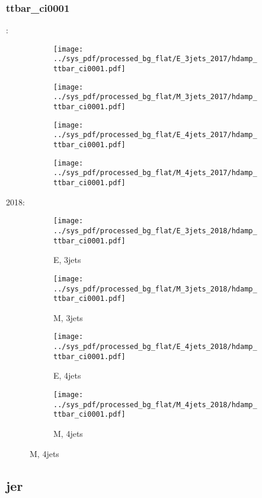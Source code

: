 \documentclass{beamer}
\begin{document}
\begin{frame}
\frametitle{ttbar_ci0001}
\fontsize{5}{1}:
\begin{figure}
\centering
\begin{subfigure}[b]{0.24\textwidth}
\texttt{[image: ../sys\_pdf/processed\_bg\_flat/E\_3jets\_2017/hdamp\_ttbar\_ci0001.pdf]}
\end{subfigure}
\begin{subfigure}[b]{0.24\textwidth}
\texttt{[image: ../sys\_pdf/processed\_bg\_flat/M\_3jets\_2017/hdamp\_ttbar\_ci0001.pdf]}
\end{subfigure}
\begin{subfigure}[b]{0.24\textwidth}
\texttt{[image: ../sys\_pdf/processed\_bg\_flat/E\_4jets\_2017/hdamp\_ttbar\_ci0001.pdf]}
\end{subfigure}
\begin{subfigure}[b]{0.24\textwidth}
\texttt{[image: ../sys\_pdf/processed\_bg\_flat/M\_4jets\_2017/hdamp\_ttbar\_ci0001.pdf]}
\end{subfigure}
\end{figure}
2018:
\begin{figure}
\centering
\begin{subfigure}[b]{0.24\textwidth}
\texttt{[image: ../sys\_pdf/processed\_bg\_flat/E\_3jets\_2018/hdamp\_ttbar\_ci0001.pdf]}
\captionsetup{font=tiny}
\caption{E, 3jets}
\end{subfigure}
\begin{subfigure}[b]{0.24\textwidth}
\texttt{[image: ../sys\_pdf/processed\_bg\_flat/M\_3jets\_2018/hdamp\_ttbar\_ci0001.pdf]}
\captionsetup{font=tiny}
\caption{M, 3jets}
\end{subfigure}
\begin{subfigure}[b]{0.24\textwidth}
\texttt{[image: ../sys\_pdf/processed\_bg\_flat/E\_4jets\_2018/hdamp\_ttbar\_ci0001.pdf]}
\captionsetup{font=tiny}
\caption{E, 4jets}
\end{subfigure}
\begin{subfigure}[b]{0.24\textwidth}
\texttt{[image: ../sys\_pdf/processed\_bg\_flat/M\_4jets\_2018/hdamp\_ttbar\_ci0001.pdf]}
\captionsetup{font=tiny}
\caption{M, 4jets}
\end{subfigure}
\end{figure}
\end{frame}


\subsection{jer}
\end{document}
